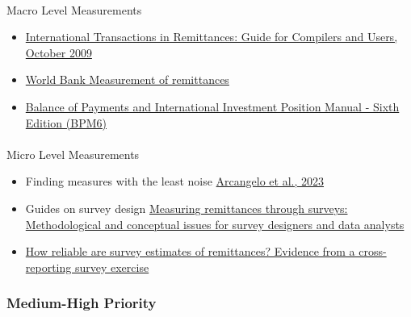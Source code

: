 \documentclass[
  11pt,
]{article}
\makeatletter
\let\oldparagraph\paragraph
\renewcommand{\paragraph}{
    \@ifstar
      \xxxParagraphStar
      \xxxParagraphNoStar
  }
\newcommand{\xxxParagraphStar}[1]{\oldparagraph*{#1}\mbox{}}
\newcommand{\xxxParagraphNoStar}[1]{\oldparagraph{#1}\mbox{}}
\providecommand{\tightlist}{%
  \setlength{\itemsep}{0pt}\setlength{\parskip}{0pt}}
\makeatother
\begin{document}
\paragraph{Macro Level Measurements}\label{macro-level-measurements}

\begin{itemize}
\tightlist
\item
  \href{https://www.imf.org/external/np/sta/bop/2008/rcg/pdf/guide.pdf}{International
  Transactions in Remittances: Guide for Compilers and Users, October
  2009}
\item
  \href{https://openknowledge.worldbank.org/server/api/core/bitstreams/e90c4fd4-2c7d-4d29-9082-2b4f0484fc2b/content}{World
  Bank Measurement of remittances}
\item
  \href{https://www.imf.org/external/pubs/ft/bop/2007/pdf/bpm6.pdf}{Balance
  of Payments and International Investment Position Manual - Sixth
  Edition (BPM6)}
\end{itemize}

\paragraph{Micro Level Measurements}\label{micro-level-measurements}

\begin{itemize}
\tightlist
\item
  Finding measures with the least noise
  \href{https://drive.google.com/file/d/1pAtaJZZPiYqQxYHhQaiGtDIG2D1GC0vw/view?usp=sharing}{Arcangelo
  et al., 2023}
\item
  Guides on survey design
  \href{https://www.demographic-research.org/volumes/vol31/41/31-41.pdf}{Measuring
  remittances through surveys: Methodological and conceptual issues for
  survey designers and data analysts}
\item
  \href{https://drive.google.com/file/d/1qHRsa8y1B27oIXDuT47WWF27yRyu5Pyj/view?usp=sharing}{How
  reliable are survey estimates of remittances? Evidence from a
  cross-reporting survey exercise}
\end{itemize}

\subsubsection{Medium-High Priority}\label{medium-high-priority}
\end{document}
